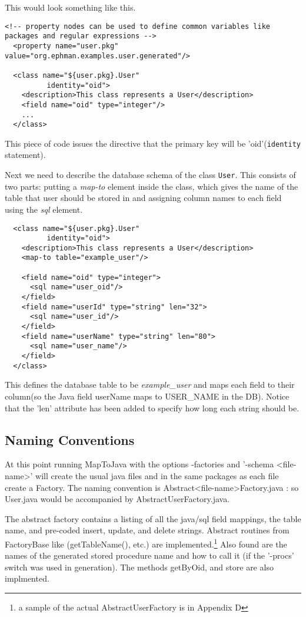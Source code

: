 \documentclass[10pt,openany]{book}
\begin{document}
This would look something like this.
\begin{verbatim}
<!-- property nodes can be used to define common variables like
packages and regular expressions -->
  <property name="user.pkg" value="org.ephman.examples.user.generated"/>

  <class name="${user.pkg}.User"
          identity="oid">
    <description>This class represents a User</description>
    <field name="oid" type="integer"/>
    ...
  </class>
\end{verbatim}
This piece of code issues the directive that the primary key will be
'oid'(\texttt{identity} statement).


Next we need to describe the database schema of the class \texttt{User}.  This
consists of two parts:  putting a \textit{map-to} element inside the class,
which gives the name of the table that user should be stored in
and assigning column names to each field using the \textit{sql} element.
\begin{verbatim}
  <class name="${user.pkg}.User"
          identity="oid">
    <description>This class represents a User</description>
    <map-to table="example_user"/>

    <field name="oid" type="integer">
      <sql name="user_oid"/>
    </field>
    <field name="userId" type="string" len="32">
      <sql name="user_id"/>
    </field>
    <field name="userName" type="string" len="80">
      <sql name="user_name"/>
    </field>
  </class>
\end{verbatim}
This defines the database table to be \textit{example\_user} and maps each field to
their column(so the Java field userName maps to USER\_NAME in the DB).
Notice that the 'len' attribute has been added to specify how long
each string should be. 

\subsection{Naming Conventions}
At this point running MapToJava with the options \textsf{-factories} and
'-schema \textless file-name\textgreater'  will create the usual java files and in the
same packages as each file create a Factory.  The naming convention is
Abstract\textless file-name\textgreater Factory.java : so User.java
would be accompanied by AbstractUserFactory.java.

The abstract factory contains a listing of all the java/sql field
mappings, the table name, and pre-coded insert, update, and delete strings.
Abstract routines from FactoryBase like (getTableName(), etc.) are
implemented.\footnote{a sample of the actual AbstractUserFactory is in
Appendix D}  Also found are the names of the generated stored
procedure name and how to call it (if the '-procs' switch was used in
generation).  The methods getByOid, and store are also implmented.
\end{document}
